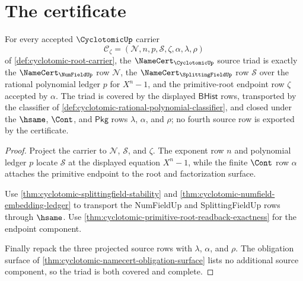 \section{The certificate}
\label{sec:cyclotomic-certificate}

\begin{theorem}
\label{thm:cyclotomic-source-triad-obligation}
For every accepted $\CyclotomicUp$ carrier
$$
\mathcal{C}_{\zeta}=(\mathcal{N},n,p,\mathcal{S},\zeta,\alpha,\lambda,\rho)
$$
of \autoref{def:cyclotomic-root-carrier}, the $\NameCert_{\CyclotomicUp}$ source triad is exactly the $\NameCert_{\NumFieldUp}$ row $\mathcal{N}$, the $\NameCert_{\SplittingFieldUp}$ row $\mathcal{S}$ over the rational polynomial ledger $p$ for $X^n-1$, and the primitive-root endpoint row $\zeta$ accepted by $\alpha$. The triad is covered by the displayed $\mathsf{BHist}$ rows, transported by the classifier of \autoref{def:cyclotomic-rational-polynomial-classifier}, and closed under the $\hsame$, $\Cont$, and $\mathsf{Pkg}$ rows $\lambda$, $\alpha$, and $\rho$; no fourth source row is exported by the certificate.
\end{theorem}
\begin{proof}
Project the carrier to $\mathcal{N}$, $\mathcal{S}$, and $\zeta$. The exponent row $n$ and polynomial ledger $p$ locate $\mathcal{S}$ at the displayed equation $X^n-1$, while the finite $\Cont$ row $\alpha$ attaches the primitive endpoint to the root and factorization surface.

Use \autoref{thm:cyclotomic-splittingfield-stability} and \autoref{thm:cyclotomic-numfield-embedding-ledger} to transport the NumFieldUp and SplittingFieldUp rows through $\hsame$. Use \autoref{thm:cyclotomic-primitive-root-readback-exactness} for the endpoint component.

Finally repack the three projected source rows with $\lambda$, $\alpha$, and $\rho$. The obligation surface of \autoref{thm:cyclotomic-namecert-obligation-surface} lists no additional source component, so the triad is both covered and complete.
\end{proof}

